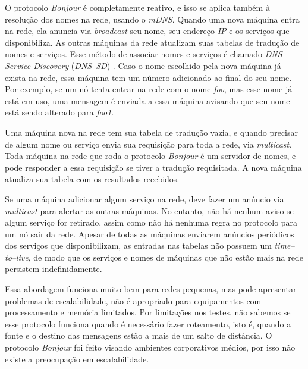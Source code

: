         O protocolo \textit{Bonjour} é completamente reativo, e isso se aplica também
        à resolução dos nomes na rede, usando o \textit{mDNS}. Quando uma nova máquina
        entra na rede, ela anuncia via \textit{broadcast} seu nome, seu endereço 
        \emph{IP} e os serviços que disponibiliza. As outras máquinas da rede 
        atualizam suas tabelas de tradução de nomes e serviços. Esse método de 
        associar nomes e serviços é chamado \textit{DNS Service Discovery} 
        (\textit{DNS--SD}) \cite{dnssd}. Caso o nome escolhido pela nova máquina 
        já exista na rede, essa máquina tem um número adicionado ao final do seu 
        nome. Por exemplo, se um nó tenta entrar na rede com o nome \emph{foo}, mas
        esse nome já está em uso, uma mensagem é enviada a essa máquina avisando 
        que seu nome está sendo alterado para \emph{foo1}.

        Uma máquina nova na rede tem sua tabela de tradução vazia, e quando 
        precisar de algum nome ou serviço envia sua requisição para toda a rede,
        via \textit{multicast}. Toda máquina na rede que roda o protocolo
        \textit{Bonjour} é um servidor de nomes, e pode responder a essa 
        requisição se tiver a tradução requisitada. A nova máquina atualiza sua 
        tabela com os resultados recebidos.

        Se uma máquina adicionar algum serviço na rede, deve fazer um anúncio via
        \textit{multicast} para alertar as outras máquinas. No entanto, não há 
        nenhum aviso se algum serviço for retirado, assim como não há nenhuma 
        regra no protocolo para um nó sair da rede. Apesar de todas as máquinas 
        enviarem anúncios periódicos dos serviços que disponibilizam, as entradas
        nas tabelas não possuem um \textit{time--to--live}, de modo que os serviços
        e nomes de máquinas que não estão mais na rede persistem indefinidamente.

        Essa abordagem funciona muito bem para redes pequenas, mas pode apresentar
        problemas de escalabilidade, não é apropriado para equipamentos com 
        processamento e memória limitados. Por limitações nos testes, não sabemos
        se esse protocolo funciona quando é necessário fazer roteamento, isto é,
        quando a fonte e o destino das mensagens estão a mais de um salto de 
        distância. O protocolo \textit{Bonjour} foi feito visando ambientes 
        corporativos médios, por isso não existe a preocupação em escalabilidade.


